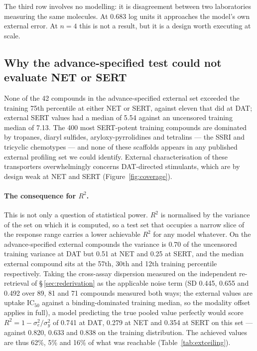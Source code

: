 \documentclass[11pt,a4paper]{article}
\begin{document}
The third row involves no modelling: it is disagreement between two laboratories
measuring the same molecules. At 0.683 log units it approaches the model's own external
error. At $n=4$ this is not a result, but it is a design worth executing at scale.

\subsection{Why the advance-specified test could not evaluate NET or SERT}
\label{sec:cannot-evaluate}

None of the 42 compounds in the advance-specified external set exceeded the training 75th
percentile at either NET or SERT, against eleven that did at DAT; external SERT values
had a median of 5.54 against an uncensored training median of 7.13. The 400 most
SERT-potent training compounds are
dominated by tropanes, diaryl sulfides, aryloxy-pyrrolidines and tetralins --- the SSRI
and tricyclic chemotypes --- and none of these scaffolds appears in any published
external profiling set we could identify. External characterisation of these
transporters overwhelmingly concerns DAT-directed stimulants, which are by design weak
at NET and SERT (Figure~\ref{fig:coverage}).

\paragraph{The consequence for $R^2$.} This is not only a question of statistical power.
$R^2$ is normalised by the variance of the set on which it is computed, so a test set
that occupies a narrow slice of the response range carries a lower achievable $R^2$ for
any model whatever. On the advance-specified external compounds the variance is 0.70 of the
uncensored training variance at DAT but 0.51 at NET and 0.25 at SERT, and the median
external compound sits at the 57th, 30th and 12th training percentile respectively.
Taking the cross-assay dispersion measured on the independent re-retrieval of
\S\,\ref{sec:rederivation} as the applicable noise term (SD 0.445, 0.655 and 0.492 over
89, 81 and 71 compounds measured both ways; the external values are uptake IC$_{50}$
against a binding-dominated training median, so the modality offset applies in full), a
model predicting the true pooled value perfectly would score
$R^2 = 1 - \sigma^2_e/\sigma^2_y$ of 0.741 at DAT, 0.279 at NET and 0.354 at SERT on this
set --- against 0.820, 0.633 and 0.838 on the training distribution. The achieved values
are thus 62\%, 5\% and 16\% of what was reachable (Table~\ref{tab:extceiling}).
\end{document}
